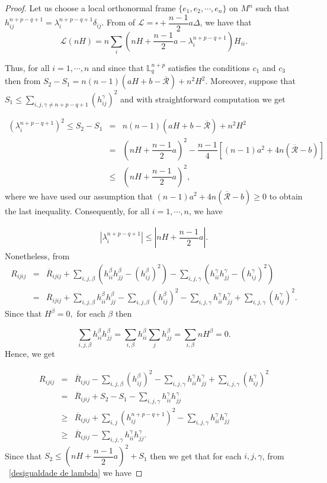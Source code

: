 \documentclass[leqno,11pt]{amsart}
\theoremstyle{plain}
\theoremstyle{definition}
\numberwithin{equation}{section}
\begin{document}
\begin{proof}
 Let us choose a local orthonormal frame $\{e_1,e_2,\cdots,e_n\}$ on $M^n$ such that $h_{ij}^{n+p-q+1}=\lambda_{i}^{n+p-q+1}\delta_{ij}.$ From of $\mathcal{L}=\square +\dfrac{n-1}{2}a\Delta$,  we have that 
\begin{equation}
\mathcal{L}(nH)=n\sum_{i}\left(nH+\dfrac{n-1}{2}a-\lambda_{i}^{n+p-q+1}\right)H_{ii}.
\end{equation}

Thus, for all $i=1,\cdots,n$ and since that $\mathbb{L}_{q}^{n+p}$ satisfies the conditions $c_1$ and $c_3$ then from $S_2-S_1=n(n-1)(aH+b-\overline{\mathcal{R}})+n^2H^2.$ Moreover, suppose that $S_1\leq \displaystyle\sum_{i,j,\gamma\neq n+p-q+1}(h_{ij}^{\gamma})^2$
 and with straightforward computation we get

 \begin{eqnarray*}
 (\lambda_i^{n+p-q+1})^2\leq S_2-S_1&=&n(n-1)(aH+b-\overline{\mathcal{R}})+n^2H^2\\
 &=&\left(nH+\dfrac{n-1}{2}a\right)^2-\dfrac{n-1}{4}\left[(n-1)a^2+4n(\overline{\mathcal{R}}-b)\right]\\
 &\leq& \left(nH+\dfrac{n-1}{2}a\right)^2,
 \end{eqnarray*}
where we have used our assumption that $(n-1)a^2+4n(\overline{\mathcal{R}}-b)\geq 0$  to obtain
the last inequality. Consequently, for all $i=1,\cdots,n$, we have

\begin{eqnarray}\label{desigualdade de lambda}
|\lambda_i^{n+p-q+1}|\leq \left|nH+\dfrac{n-1}{2}a\right|.
\end{eqnarray}
Nonetheless, from 
\begin{eqnarray*}
R_{ijij}&=&\overline{R}_{ijij}+\sum_{i,j,\beta}(h_{ii}^{\beta}h_{jj}^{\beta}-(h_{ij}^{\beta})^2)-\sum_{i,j,\gamma}(h_{ii}^{\gamma}h_{jj}^{\gamma}-(h_{ij}^{\gamma})^2)\\
&=&\overline{R}_{ijij}+\sum_{i,j,\beta}h_{ii}^{\beta}h_{jj}^{\beta}-\sum_{i,j,\beta}(h_{ij}^{\beta})^2-\sum_{i,j,\gamma}h_{ii}^{\gamma}h_{jj}^{\gamma}+\sum_{i,j,\gamma}(h_{ij}^{\gamma})^2.
\end{eqnarray*}
Since that $H^{\beta}=0,$  for each $\beta$ then 

$$\sum_{i,j,\beta}h_{ii}^{\beta}h_{jj}^{\beta}=\sum_{i,\beta}h_{ii}^{\beta}\sum_{j}h_{jj}^{\beta}=\sum_{i,\beta}nH^{\beta}=0.$$
Hence, we get

\begin{eqnarray*}
R_{ijij}&=&\overline{R}_{ijij}-\sum_{i,j,\beta}(h_{ij}^{\beta})^2-\sum_{i,j,\gamma}h_{ii}^{\gamma}h_{jj}^{\gamma}+\sum_{i,j,\gamma}(h_{ij}^{\gamma})^2\\
&=&\overline{R}_{ijij}+S_2-S_1-\sum_{i,j,\gamma}h_{ii}^{\gamma}h_{jj}^{\gamma}\\
&\geq&\overline{R}_{ijij}+\sum_{i,j}(h_{ij}^{n+p-q+1})^2-\sum_{i,j,\gamma}h_{ii}^{\gamma}h_{jj}^{\gamma}\\
&\geq& \overline{R}_{ijij}-\sum_{i,j,\gamma}h_{ii}^{\gamma}h_{jj}^{\gamma}.
\end{eqnarray*}
Since that $S_2\leq \left(nH+\dfrac{n-1}{2}a\right)^2+S_1$ then we get that for each $i,j,\gamma$, from ~\eqref{desigualdade de lambda} we have


\end{proof}
\end{document}
